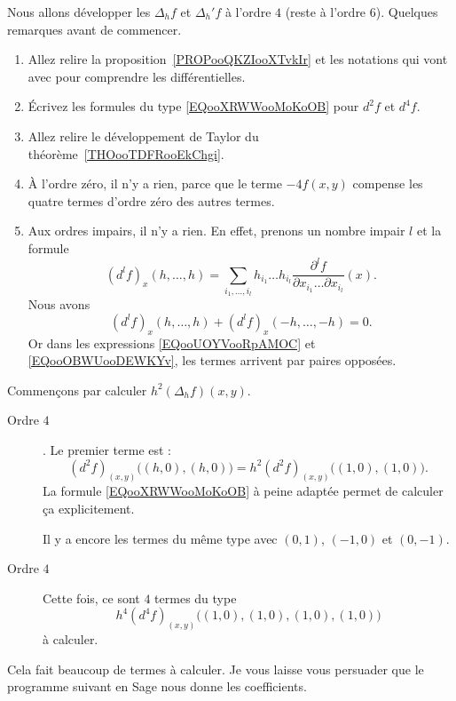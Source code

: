 Nous allons développer les \( \Delta_hf\) et \( \Delta_h'f\) à l'ordre \( 4\) (reste à l'ordre \( 6\)). Quelques remarques avant de commencer.
\begin{enumerate}
	\item
	      Allez relire la proposition~\ref{PROPooQKZIooXTvkIr} et les notations qui vont avec pour comprendre les différentielles.
	\item
	      Écrivez les formules du type \eqref{EQooXRWWooMoKoOB} pour \( d^2f\) et \( d^4f\).
	\item
	      Allez relire le développement de Taylor du théorème~\ref{THOooTDFRooEkChgi}.
	\item
	      À l'ordre zéro, il n'y a rien, parce que le terme \( -4f(x,y)\) compense les quatre termes d'ordre zéro des autres termes.
	\item
	      Aux ordres impairs, il n'y a rien. En effet, prenons un nombre impair \( l\) et la formule
	      \begin{equation}
		      (d^lf)_x(h,\ldots, h)=\sum_{i_1,\ldots, i_l}h_{i_1}\ldots h_{i_l}\frac{ \partial^lf }{ \partial x_{i_1}\ldots \partial x_{i_l} }(x).
	      \end{equation}
	      Nous avons
	      \begin{equation}
		      (d^lf)_x(h,\ldots, h)+(d^lf)_x(-h,\ldots, -h)=0.
	      \end{equation}
	      Or dans les expressions \eqref{EQooUOYVooRpAMOC} et \eqref{EQooOBWUooDEWKYv}, les termes arrivent par paires opposées.
\end{enumerate}

Commençons par calculer \( h^2(\Delta_hf)(x,y)\).
\begin{description}
	\item[Ordre \( 4\)]. Le premier terme est :
	      \begin{equation}
		      (d^2f)_{(x,y)}\big( (h,0),(h,0) \big)=h^2(d^2f)_{(x,y)}\big( (1,0),(1,0) \big).
	      \end{equation}
	      La formule \eqref{EQooXRWWooMoKoOB} à peine adaptée permet de calculer ça explicitement.

	      Il y a encore les termes du même type avec \( (0,1)\), \( (-1,0)\) et \( (0,-1)\).

	\item[Ordre \( 4\)]
	      Cette fois, ce sont \( 4\) termes du type
	      \begin{equation}
		      h^4(d^4f)_{(x,y)}\big( (1,0),(1,0),(1,0),(1,0) \big)
	      \end{equation}
	      à calculer.
\end{description}
Cela fait beaucoup de termes à calculer. Je vous laisse vous persuader que le programme suivant en Sage nous donne les coefficients.


